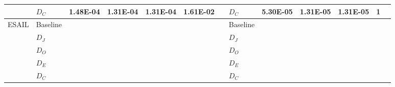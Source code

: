 \begin{table*}
\begin{tabular}{|l|l|lllll|l|lllll|}
           & $D_C$     & 1.48E-04 & 1.31E-04              & 1.31E-04              & 1.61E-02 &      & $D_C$     & 5.30E-05 & 1.31E-05              & 1.31E-05              & \multicolumn{1}{r}{1} &       \\
\hline
ESAIL      & Baseline &          &                       &                       &          &      & Baseline &          &                       &                       &                       &       \\
           & $D_J$     &          &                       &                       &          &      & $D_J$     &          &                       &                       &                       &       \\
           & $D_O$     &          &                       &                       &          &      & $D_O$     &          &                       &                       &                       &       \\
           & $D_E$     &          &                       &                       &          &      & $D_E$     &          &                       &                       &                       &       \\
           & $D_C$     &          &                       &                       &          &      & $D_C$     &          &                       &                       &                       &      \\
\hline           
\end{tabular}
\end{table*}

